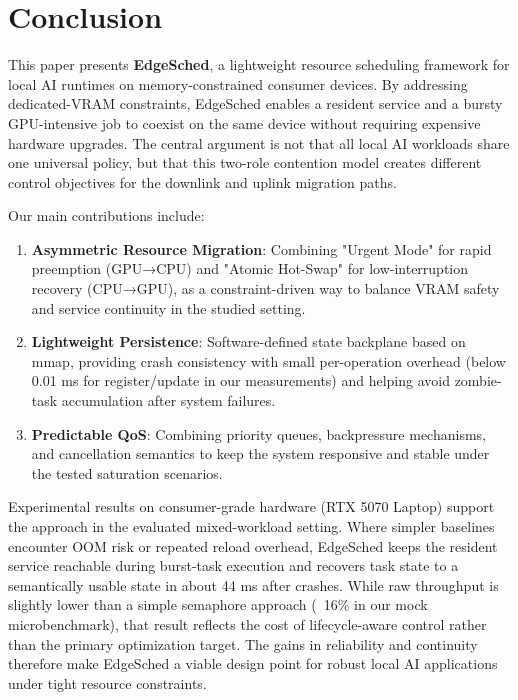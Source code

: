 \section{Conclusion}

This paper presents \textbf{EdgeSched}, a lightweight resource scheduling framework for local AI runtimes on memory-constrained consumer devices. By addressing dedicated-VRAM constraints, EdgeSched enables a resident service and a bursty GPU-intensive job to coexist on the same device without requiring expensive hardware upgrades. The central argument is not that all local AI workloads share one universal policy, but that this two-role contention model creates different control objectives for the downlink and uplink migration paths.

Our main contributions include:
\begin{enumerate}
\item \textbf{Asymmetric Resource Migration}: Combining "Urgent Mode" for rapid preemption (GPU→CPU) and "Atomic Hot-Swap" for low-interruption recovery (CPU→GPU), as a constraint-driven way to balance VRAM safety and service continuity in the studied setting.

\item \textbf{Lightweight Persistence}: Software-defined state backplane based on mmap, providing crash consistency with small per-operation overhead (below 0.01 ms for register/update in our measurements) and helping avoid zombie-task accumulation after system failures.

\item \textbf{Predictable QoS}: Combining priority queues, backpressure mechanisms, and cancellation semantics to keep the system responsive and stable under the tested saturation scenarios.
\end{enumerate}

Experimental results on consumer-grade hardware (RTX 5070 Laptop) support the approach in the evaluated mixed-workload setting. Where simpler baselines encounter OOM risk or repeated reload overhead, EdgeSched keeps the resident service reachable during burst-task execution and recovers task state to a semantically usable state in about 44 ms after crashes. While raw throughput is slightly lower than a simple semaphore approach (~16\% in our mock microbenchmark), that result reflects the cost of lifecycle-aware control rather than the primary optimization target. The gains in reliability and continuity therefore make EdgeSched a viable design point for robust local AI applications under tight resource constraints.

